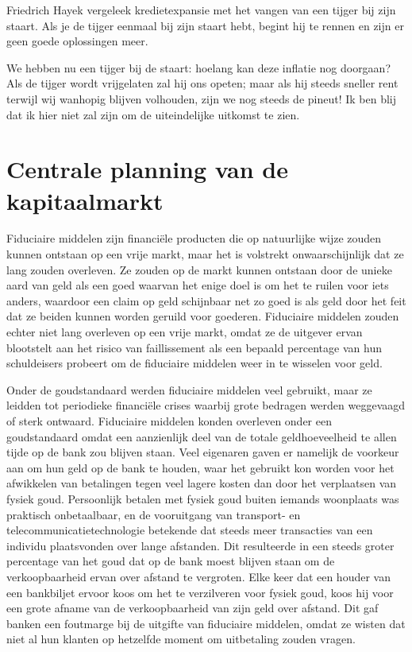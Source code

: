 Friedrich Hayek vergeleek kredietexpansie met het vangen van een tijger bij zijn staart. Als je de tijger eenmaal bij zijn staart hebt, begint hij te rennen en zijn er geen goede oplossingen meer.

\begin{blockquotebox}
We hebben nu een tijger bij de staart: hoelang kan deze inflatie nog doorgaan? Als de tijger wordt vrijgelaten zal hij ons opeten; maar als hij steeds sneller rent terwijl wij wanhopig blijven volhouden, zijn we nog steeds de pineut! Ik ben blij dat ik hier niet zal zijn om de uiteindelijke uitkomst te zien.\footnotemark
\end{blockquotebox}
\autocite{178}


\section{Centrale planning van de kapitaalmarkt}

Fiduciaire middelen zijn financiële producten die op natuurlijke wijze zouden kunnen ontstaan op een vrije markt, maar het is volstrekt onwaarschijnlijk dat ze lang zouden overleven. Ze zouden op de markt kunnen ontstaan door de unieke aard van geld als een goed waarvan het enige doel is om het te ruilen voor iets anders, waardoor een claim op geld schijnbaar net zo goed is als geld door het feit dat ze beiden kunnen worden geruild voor goederen. Fiduciaire middelen zouden echter niet lang overleven op een vrije markt, omdat ze de uitgever ervan blootstelt aan het risico van faillissement als een bepaald percentage van hun schuldeisers probeert om de fiduciaire middelen weer in te wisselen voor geld.

Onder de goudstandaard werden fiduciaire middelen veel gebruikt, maar ze leidden tot periodieke financiële crises waarbij grote bedragen werden weggevaagd of sterk ontwaard. Fiduciaire middelen konden overleven onder een goudstandaard omdat een aanzienlijk deel van de totale geldhoeveelheid te allen tijde op de bank zou blijven staan. Veel eigenaren gaven er namelijk de voorkeur aan om hun geld op de bank te houden, waar het gebruikt kon worden voor het afwikkelen van betalingen tegen veel lagere kosten dan door het verplaatsen van fysiek goud. Persoonlijk betalen met fysiek goud buiten iemands woonplaats was praktisch onbetaalbaar, en de vooruitgang van transport- en telecommunicatietechnologie betekende dat steeds meer transacties van een individu plaatsvonden over lange afstanden. Dit resulteerde in een steeds groter percentage van het goud dat op de bank moest blijven staan om de verkoopbaarheid ervan over afstand te vergroten. Elke keer dat een houder van een bankbiljet ervoor koos om het te verzilveren voor fysiek goud, koos hij voor een grote afname van de verkoopbaarheid van zijn geld over afstand. Dit gaf banken een foutmarge bij de uitgifte van fiduciaire middelen, omdat ze wisten dat niet al hun klanten op hetzelfde moment om uitbetaling zouden vragen.

